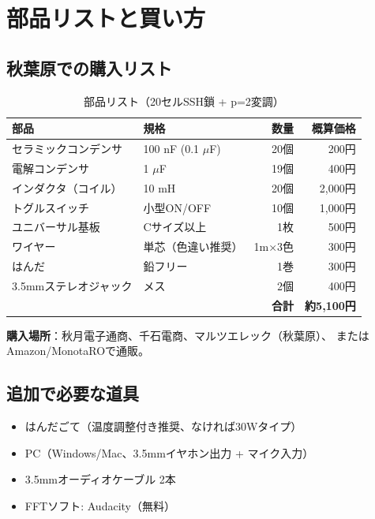 \documentclass[12pt,a4paper]{article}
\begin{document}
\section{部品リストと買い方}

\subsection{秋葉原での購入リスト}

\begin{table}[h]
\centering
\caption{部品リスト（20セルSSH鎖 + p=2変調）}
\begin{tabular}{@{}llrr@{}}
\toprule
部品 & 規格 & 数量 & 概算価格 \\
\midrule
セラミックコンデンサ & 100 nF (0.1 $\mu$F) & 20個 & 200円 \\
電解コンデンサ & 1 $\mu$F & 19個 & 400円 \\
インダクタ（コイル） & 10 mH & 20個 & 2,000円 \\
トグルスイッチ & 小型ON/OFF & 10個 & 1,000円 \\
ユニバーサル基板 & Cサイズ以上 & 1枚 & 500円 \\
ワイヤー & 単芯（色違い推奨） & 1m×3色 & 300円 \\
はんだ & 鉛フリー & 1巻 & 300円 \\
3.5mmステレオジャック & メス & 2個 & 400円 \\
\midrule
\multicolumn{3}{r}{\textbf{合計}} & \textbf{約5,100円} \\
\bottomrule
\end{tabular}
\end{table}

\textbf{購入場所}：秋月電子通商、千石電商、マルツエレック（秋葉原）、
またはAmazon/MonotaROで通販。

\subsection{追加で必要な道具}

\begin{itemize}
\item はんだごて（温度調整付き推奨、なければ30Wタイプ）
\item PC（Windows/Mac、3.5mmイヤホン出力 + マイク入力）
\item 3.5mmオーディオケーブル 2本
\item FFTソフト: Audacity（無料）
\end{itemize}
\end{document}
